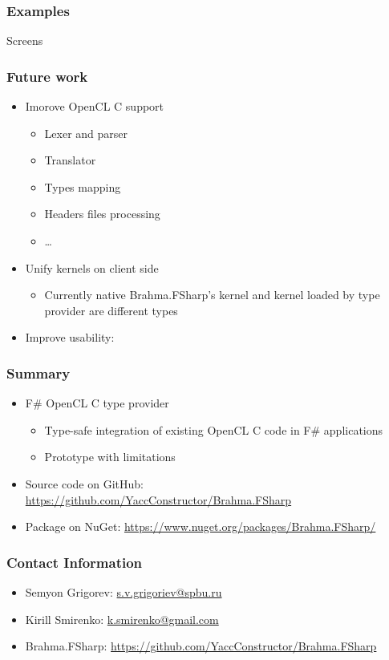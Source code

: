 \documentclass[xcolor=table]{beamer}
\begin{document}
            
\begin{frame}
  \transwipe[direction=90]
  \frametitle{Examples}         
  Screens
\end{frame}     

\begin{frame}
  \transwipe[direction=90]
  \frametitle{Future work}         
\begin{itemize}
\item Imorove OpenCL C support
\begin{itemize}
\item Lexer and parser
\item Translator 
\item Types mapping
\item Headers files processing
\item \dots
\end{itemize}
\item Unify kernels on client side
\begin{itemize}
\item Currently native Brahma.FSharp's kernel and kernel loaded by type provider are different 
types
\end{itemize}
\item Improve usability: 
\end{itemize}
\end{frame}     
            
            
\begin{frame}
  \transwipe[direction=90]
  \frametitle{Summary}         
\begin{itemize}
\item F\# OpenCL C type provider
\begin {itemize}
\item Type-safe integration of existing OpenCL C code in F\# applications
\item Prototype with limitations
\end{itemize}
\vspace{1cm}
\item Source code on GitHub: \url{https://github.com/YaccConstructor/Brahma.FSharp}
\item Package on NuGet: \url{https://www.nuget.org/packages/Brahma.FSharp/}
\end{itemize}
\end{frame}           
            
\begin{frame}
\transwipe[direction=90]
\frametitle{Contact Information}
\begin{itemize}
  \item Semyon Grigorev: \href{mailto:s.v.grigoriev@spbu.ru}{s.v.grigoriev@spbu.ru}
  \item Kirill Smirenko: \href{mailto:k.smirenko@gmail.com}{k.smirenko@gmail.com}
\end{itemize}
\begin{itemize}
  \item Brahma.FSharp: \href{https://github.com/YaccConstructor/Brahma.FSharp}{https://github.com/YaccConstructor/Brahma.FSharp}
\end{itemize}
\hspace{2cm}
\end{frame}
\end{document}
